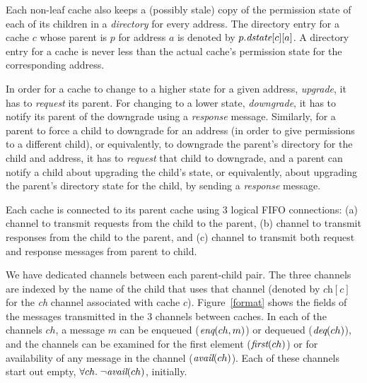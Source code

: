 
Each non-leaf cache also keeps a (possibly stale) copy of the permission state of
each of its children in a \emph{directory} for every address. The directory
entry for a cache $c$ whose parent is $p$ for address $a$ is denoted by
$p.\textit{dstate}[c][a]$. A directory entry for a cache is never
less than the actual cache's permission state for the corresponding address.

In order for a cache to change to a higher state for a given address, \ie{}
\emph{upgrade}, it has to \emph{request} its parent.  For changing to a lower
state, \ie{} \emph{downgrade}, it has to notify its parent of the downgrade
using a \emph{response} message.  Similarly, for a parent to force a child to
downgrade for an address (in order to give permissions to a different child),
or equivalently, to downgrade the parent's directory for the child and address,
it has to \emph{request} that child to downgrade, and a parent can notify a
child about upgrading the child's state, or equivalently, about upgrading the
parent's directory state for the child, by sending a \emph{response} message.

Each cache is connected to its parent cache using 3 logical FIFO connections:
(a) \cpReq{} channel to transmit requests from the child to the parent, (b)
\cpResp{} channel to transmit responses from the child to the parent, and (c)
\pc{} channel to transmit both request and response messages from parent to
child. 

We have dedicated channels between each parent-child pair. The three channels
are indexed by the name of the child that uses that channel (denoted by
$\textit{ch}[c]$ for the \textit{ch} channel associated
with cache $c$).  Figure~\ref{format} shows the fields of the messages
transmitted in the 3 channels between caches. In each of the channels $ch$, a
message $m$ can be enqueued ($\textit{enq}(ch, m)$) or dequeued ($\textit{deq}(ch)$), and the
channels can be examined for the first element ($\textit{first}(ch)$) or for
availability of any message in the channel ($\textit{avail}(ch)$). Each of these
channels start out empty, \ie{} $\forall ch. \; \neg \textit{avail}(ch)$, initially.


